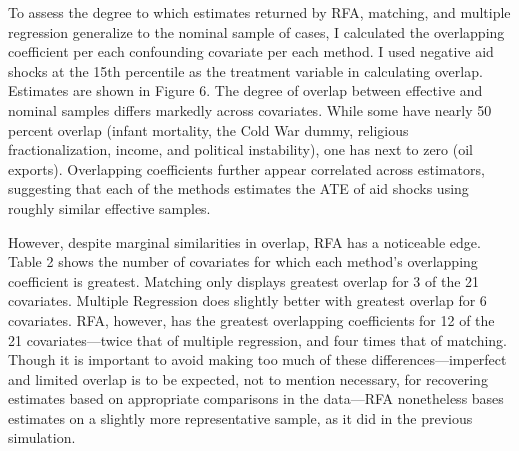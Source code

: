 \documentclass[11pt,]{article}
\begin{document}
To assess the degree to which estimates returned by RFA, matching, and
multiple regression generalize to the nominal sample of cases, I
calculated the overlapping coefficient per each confounding covariate
per each method. I used negative aid shocks at the 15\(\text{th}\)
percentile as the treatment variable in calculating overlap. Estimates
are shown in Figure 6. The degree of overlap between effective and
nominal samples differs markedly across covariates. While some have
nearly 50 percent overlap (infant mortality, the Cold War dummy,
religious fractionalization, income, and political instability), one has
next to zero (oil exports). Overlapping coefficients further appear
correlated across estimators, suggesting that each of the methods
estimates the ATE of aid shocks using roughly similar effective samples.

However, despite marginal similarities in overlap, RFA has a noticeable
edge. Table 2 shows the number of covariates for which each method's
overlapping coefficient is greatest. Matching only displays greatest
overlap for 3 of the 21 covariates. Multiple Regression does slightly
better with greatest overlap for 6 covariates. RFA, however, has the
greatest overlapping coefficients for 12 of the 21 covariates---twice
that of multiple regression, and four times that of matching. Though it
is important to avoid making too much of these differences---imperfect
and limited overlap is to be expected, not to mention necessary, for
recovering estimates based on appropriate comparisons in the data---RFA
nonetheless bases estimates on a slightly more representative sample, as
it did in the previous simulation.
\end{document}

